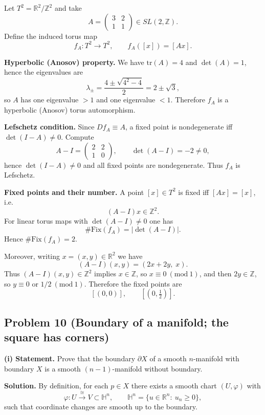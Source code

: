 \documentclass[12pt,a4paper]{article}
\theoremstyle{plain}
\theoremstyle{definition}      %
\begin{document}
Let $T^2=\mathbb{R}^2/\mathbb{Z}^2$ and take
\[
A=\begin{pmatrix}3&2\\1&1\end{pmatrix}\in SL(2,\mathbb{Z}).
\]
Define the induced torus map
\[
f_A:T^2\to T^2,\qquad f_A([x])=[Ax].
\]

\medskip
\noindent\textbf{Hyperbolic (Anosov) property.}
We have $\mathrm{tr}(A)=4$ and $\det(A)=1$, hence the eigenvalues are
\[
\lambda_{\pm}=\frac{4\pm\sqrt{4^2-4}}{2}=2\pm\sqrt{3},
\]
so $A$ has one eigenvalue $>1$ and one eigenvalue $<1$.
Therefore $f_A$ is a hyperbolic (Anosov) torus automorphism.

\medskip
\noindent\textbf{Lefschetz condition.}
Since $Df_A\equiv A$, a fixed point is nondegenerate iff $\det(I-A)\neq 0$.
Compute
\[
A-I=\begin{pmatrix}2&2\\1&0\end{pmatrix},
\qquad
\det(A-I) = -2\neq 0,
\]
hence $\det(I-A)\neq 0$ and all fixed points are nondegenerate. Thus $f_A$ is Lefschetz.

\medskip
\noindent\textbf{Fixed points and their number.}
A point $[x]\in T^2$ is fixed iff $[Ax]=[x]$, i.e.
\[
(A-I)x\in \mathbb{Z}^2.
\]
For linear torus maps with $\det(A-I)\neq 0$ one has
\[
\#\mathrm{Fix}(f_A)=|\det(A-I)|.
\]
Hence $\#\mathrm{Fix}(f_A)=2$.

Moreover, writing $x=(x,y)\in\mathbb{R}^2$ we have
\[
(A-I)(x,y)=(2x+2y,\; x).
\]
Thus $(A-I)(x,y)\in\mathbb{Z}^2$ implies $x\in\mathbb{Z}$, so $x\equiv 0\ (\mathrm{mod}\ 1)$, and then
$2y\in\mathbb{Z}$, so $y\equiv 0$ or $1/2\ (\mathrm{mod}\ 1)$.
Therefore the fixed points are
\[
[(0,0)],\qquad \left[(0,\tfrac12)\right].
\]



\subsection*{Problem 10 (Boundary of a manifold; the square has corners)}

\textbf{(i) Statement.} Prove that the boundary $\partial X$ of a smooth $n$-manifold with boundary $X$
is a smooth $(n-1)$-manifold without boundary.

\medskip
\noindent\textbf{Solution.}
By definition, for each $p\in X$ there exists a smooth chart $(U,\varphi)$ with
\[
\varphi:U\stackrel{\cong}{\longrightarrow} V\subset \mathbb{H}^n,
\qquad \mathbb{H}^n=\{u\in\mathbb{R}^n:\ u_n\ge 0\},
\]
such that coordinate changes are smooth up to the boundary.
\end{document}
